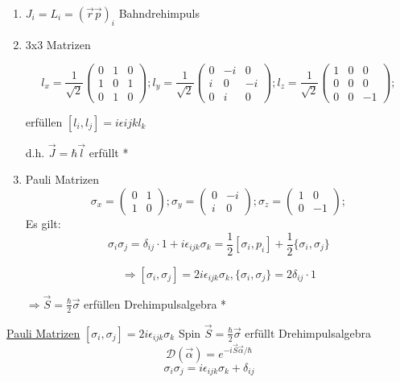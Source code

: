 \begin{enumerate}
\item \(J_i = L_i = (\vec r  \vec p)_i\) Bahndrehimpuls
\item 3x3 Matrizen 


\[
l_x=\frac 1 {\sqrt 2} \left( \begin{array}{ccc} 0&1&0\\1&0&1\\0&1&0\end{array}
\right);
l_y=\frac 1 {\sqrt 2} \left( \begin{array}{ccc} 0&-i&0\\i&0&-i\\0&i&0\end{array}
\right);
l_z=\frac 1 {\sqrt 2} \left( \begin{array}{ccc} 1&0&0\\0&0&0\\0&0&-1\end{array}
\right);
\]

erfüllen \([l_i,l_j]=i\epsilon {ijk}l_k\)

d.h. \(\vec J = \hbar \vec l\) erfüllt *
\item Pauli Matrizen
\[
\sigma_x= \left( \begin{array}{cc} 0&1\\1&0 \end{array}\right);
\sigma_y= \left( \begin{array}{cc} 0&-i\\i&0 \end{array}\right);
\sigma_z= \left( \begin{array}{cc} 1&0\\0&-1 \end{array}\right);
\]
Es gilt:
\[
\sigma_i\sigma_j=\delta_{ij}\cdot 1 + i\epsilon_{ijk}\sigma_k=\frac 1 2
[\sigma_i,p_i]+\frac 1 2\{\sigma_i,\sigma_j\}
\]

\[
\Rightarrow [\sigma_i,\sigma_j]=2i\epsilon_{ijk}\sigma_k,\{\sigma_i,\sigma_j\}=2\delta_{ij} \cdot 1
\]

\(\Rightarrow \vec S = \frac \hbar 2 \vec \sigma\) erfüllen Drehimpulsalgebra *

\end{enumerate}


\underline{Pauli Matrizen}
\([\sigma_i,\sigma_j]=2i\epsilon_{ijk}\sigma_k\)
Spin \(\vec S=\frac \hbar 2 \vec\sigma\) erfüllt
Drehimpulsalgebra
\[\mathcal D(\vec \alpha)=e^{-i\vec S\vec\alpha/\hbar}\]
\[ \sigma_i\sigma_j=i\epsilon_{ijk}\sigma_k+\delta_{ij}\]

